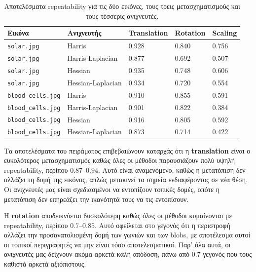 \documentclass[12pt, a4paper]{article}
\begin{document}
\begin{table}[H]
    \centering
    \caption{Αποτελέσματα repeatability για τις δύο εικόνες, τους τρεις
             μετασχηματισμούς και τους τέσσερις ανιχνευτές.}
    \label{tab:repeatability_results}
    \small
    \begin{tabular}{>{\raggedright\arraybackslash}m{3.4cm} >{\raggedright\arraybackslash}m{3.0cm} m{1.8cm} m{1.8cm} m{1.8cm}}
        \toprule
        Εικόνα & Ανιχνευτής & Translation & Rotation & Scaling \\
        \midrule
        \texttt{solar.jpg} & Harris & 0.928 & 0.840 & 0.756 \\
        \texttt{solar.jpg} & Harris-Laplacian & 0.877 & 0.692 & 0.507 \\
        \texttt{solar.jpg} & Hessian & 0.935 & 0.748 & 0.606 \\
        \texttt{solar.jpg} & Hessian-Laplacian & 0.934 & 0.720 & 0.554 \\
        \midrule
        \texttt{blood\_cells.jpg} & Harris & 0.910 & 0.855 & 0.591 \\
        \texttt{blood\_cells.jpg} & Harris-Laplacian & 0.901 & 0.822 & 0.384 \\
        \texttt{blood\_cells.jpg} & Hessian & 0.916 & 0.805 & 0.592 \\
        \texttt{blood\_cells.jpg} & Hessian-Laplacian & 0.873 & 0.714 & 0.422 \\
        \bottomrule
    \end{tabular}
\end{table}

Τα αποτελέσματα του πειράματος επιβεβαιώνουν καταρχάς ότι η
\textbf{translation} είναι ο ευκολότερος μετασχηματισμός καθώς όλες οι μέθοδοι
παρουσιάζουν πολύ υψηλή repeatability, περίπου $0.87$--$0.94$. Αυτό είναι αναμενόμενο, καθώς η μετατόπιση δεν αλλάζει τη δομή της εικόνας, απλώς μετακινεί τα σημεία ενδιαφέροντος σε νέα θέση. Οι ανιχνευτές μας είναι σχεδιασμένοι να εντοπίζουν τοπικές δομές, οπότε η μετατόπιση δεν επηρεάζει την ικανότητά τους να τις εντοπίσουν.

Η \textbf{rotation} αποδεικνύεται  δυσκολότερη καθώς όλες οι μέθοδοι κυμαίνονται με repeatability, περίπου $0.7$--$0.85$. Αυτό οφείλεται στο γεγονός ότι η περιστροφή αλλάζει την προσανατολισμένη δομή των γωνιών και των blobs, με αποτέλεσμα αυτοί οι τοπικοί περιγραφητές να μην είναι τόσο αποτελεσματικοί. Παρ' όλα αυτά, οι ανιχνευτές μας δείχνουν ακόμα αρκετά καλή απόδοση, πάνω από 0.7 γεγονός που τους καθιστά αρκετά αξιόπιστους.
\end{document}
